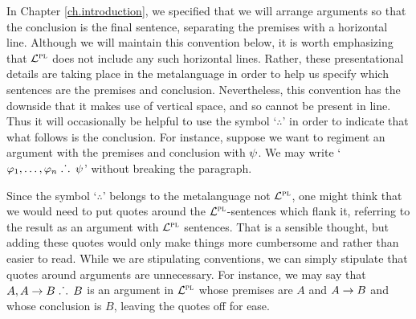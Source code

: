 
In Chapter \ref{ch.introduction}, we specified that we will arrange arguments so that the conclusion is the final sentence, separating the premises with a horizontal line.
Although we will maintain this convention below, it is worth emphasizing that $\mathcal{L}^{\textsc{pl}}$ does not include any such horizontal lines. 
Rather, these presentational details are taking place in the metalanguage in order to help us specify which sentences are the premises and conclusion.
Nevertheless, this convention has the downside that it makes use of vertical space, and so cannot be present in line.
Thus it will occasionally be helpful to use the symbol `$\therefore$' in order to indicate that what follows is the conclusion. 
For instance, suppose we want to regiment an argument with the premises and conclusion with $\psi$.
We may write `$\varphi_1, \ldots, \varphi_n \; \ldotp\dot{}\,\ldotp \; \psi$' without breaking the paragraph.


Since the symbol `$\therefore$' belongs to the metalanguage not $\mathcal{L}^{\textsc{pl}}$, one might think that we would need to put quotes around the $\mathcal{L}^{\textsc{pl}}$-sentences which flank it, referring to the result as an argument with $\mathcal{L}^{\textsc{pl}}$ sentences.
That is a sensible thought, but adding these quotes would only make things more cumbersome and rather than easier to read.
While we are stipulating conventions, we can simply stipulate that quotes around arguments are unnecessary.
For instance, we may say that $A, A \rightarrow B \; \ldotp\dot{}\,\ldotp \; B$ is an argument in $\mathcal{L}^{\textsc{pl}}$ whose premises are $A$ and $A \rightarrow B$ and whose conclusion is $B$, leaving the quotes off for ease.



